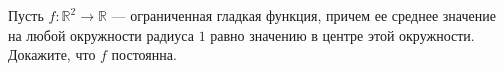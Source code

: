 \documentclass{article}
\begin{document}
Пусть $f:\mathbb{R}^2 \to \mathbb{R}$ --- ограниченная гладкая функция, причем ее среднее значение на любой окружности радиуса $1$ равно значению в центре этой окружности. Докажите, что $f$ постоянна.
\end{document}
